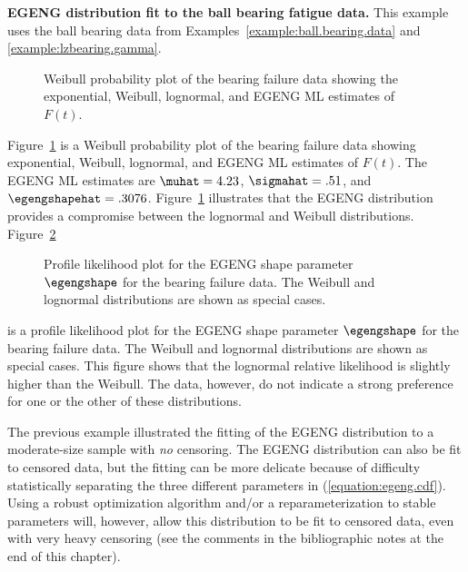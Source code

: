 \begin{example}
{\bf EGENG distribution fit to the ball bearing fatigue data.}
This example uses the ball bearing data from
Examples~\ref{example:ball.bearing.data} and
\ref{example:lzbearing.gamma}.
\begin{figure}
\caption{Weibull probability plot of the bearing
failure data showing the exponential, Weibull, lognormal, and EGENG
ML estimates of $F(t)$.}
\label{figure:bearing.egeng.gmleprobplot.ps}
\end{figure}
Figure~\ref{figure:bearing.egeng.gmleprobplot.ps} is a Weibull
probability plot of the bearing failure data showing exponential,
Weibull, lognormal, and EGENG ML estimates of $F(t)$.  The EGENG ML
estimates are $\muhat=4.23$, $\sigmahat=.51$, and $\egengshapehat=.3076$.
Figure~\ref{figure:bearing.egeng.gmleprobplot.ps} illustrates that the EGENG
distribution provides a compromise between the lognormal and Weibull
distributions.
Figure~\ref{figure:bearing.egeng.delta.profile.ps}
\begin{figure}
\caption{Profile likelihood plot for the EGENG shape parameter
$\egengshape$ for the bearing
failure data. The Weibull and lognormal distributions are shown as special
cases.}
\label{figure:bearing.egeng.delta.profile.ps}
\end{figure}
is a profile likelihood plot for the EGENG shape parameter
$\egengshape$ for the bearing failure data. The Weibull and lognormal
distributions are shown as special cases. This figure shows that the
lognormal relative likelihood is slightly higher than the Weibull.
The data, however, do not indicate a strong preference for one or the
other of these distributions.
\end{example}

The previous example illustrated the fitting of the EGENG distribution
to a moderate-size sample with {\em no} censoring.  The EGENG
distribution can also be fit to censored data, but the fitting can be
more delicate because of difficulty statistically separating the three
different parameters in (\ref{equation:egeng.cdf}).  Using a robust
optimization algorithm and/or a reparameterization to stable
parameters will, however, allow this distribution to be fit to
censored data, even with very heavy censoring (see the comments in the
bibliographic notes at the end of this chapter).

